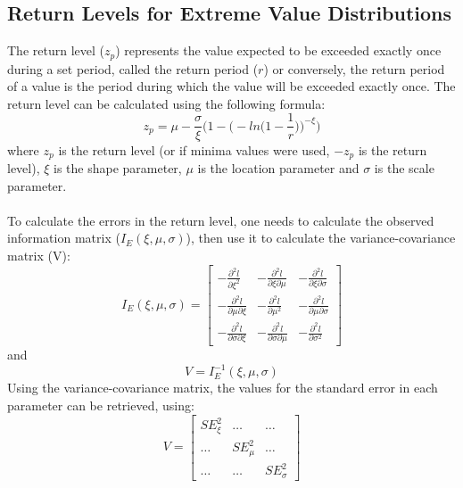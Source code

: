 \documentclass[12pt]{article}
\begin{document}
    \subsection{Return Levels for Extreme Value Distributions}\label{sec:returnlevel}
        The return level ($z_p$) represents the value expected to be exceeded exactly once during a set period, called the return period ($r$) or conversely, the return period of a value is the period during which the value will be exceeded exactly once.
        The return level can be calculated using the following formula\cite{2001coles}:
        \begin{equation}
            z_p = \mu-\frac{\sigma}{\xi}\Bigg( 1-\Bigg( -ln\Bigg( 1-\frac{1}{r}\Bigg) \Bigg) ^{-\xi}\Bigg)  
        \end{equation}
        where $z_p$ is the return level (or if minima values were used, $-z_p$ is the return level), $\xi$ is the shape parameter, $\mu$ is the location parameter and $\sigma$ is the scale parameter.\\ \\
        To calculate the errors in the return level, one needs to calculate the observed information matrix ($I_E(\xi,\mu,\sigma)$), then use it to calculate the variance-covariance matrix (V):
        \begin{equation}
            I_E(\xi,\mu,\sigma) = 
            \begin{bmatrix}
                    -\frac{\partial ^2l}{\partial \xi^2} & -\frac{\partial ^2l}{\partial \xi \partial \mu} & -\frac{\partial ^2l}{\partial \xi \partial \sigma} \\
                    -\frac{\partial ^2l}{\partial \mu \partial \xi} & -\frac{\partial ^2l}{\partial \mu^2} & -\frac{\partial ^2l}{\partial \mu \partial \sigma} \\
                    -\frac{\partial ^2l}{\partial \sigma \partial \xi} & -\frac{\partial ^2l}{\partial \sigma \partial \mu} & -\frac{\partial ^2l}{\partial \sigma^2}
            \end{bmatrix}
        \end{equation}
        and
        \begin{equation}
            V=I_E^{-1}(\xi,\mu,\sigma)
        \end{equation}
        Using the variance-covariance matrix, the values for the standard error in each parameter can be retrieved, using:
        \begin{equation}
            V=
            \begin{bmatrix}
                    SE_\xi^2 & \ldots & \ldots \\
                    \ldots & SE_\mu^2 & \ldots \\
                    \ldots & \ldots & SE_\sigma^2
            \end{bmatrix}
        \end{equation}
\end{document}
